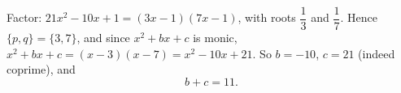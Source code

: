 Factor: \(21x^2-10x+1=(3x-1)(7x-1)\), with roots \(\dfrac{1}{3}\) and \(\dfrac{1}{7}\). Hence \(\{p,q\}=\{3,7\}\), and since \(x^2+bx+c\) is monic, \(x^2+bx+c=(x-3)(x-7)=x^2-10x+21\). So \(b=-10\), \(c=21\) (indeed coprime), and
\[
b+c=\boxed{11}.
\]
